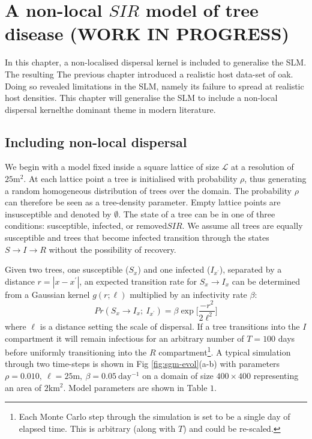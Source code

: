 \chapter{A non-local $SIR$ model of tree disease (WORK IN PROGRESS)}

In this chapter, a non-localised dispersal kernel is included to generalise the SLM.
The resulting 
The previous chapter introduced a realistic host data-set of oak. Doing so revealed limitations in the SLM, namely its failure to spread at realistic host densities.
This chapter will generalise the SLM to include a non-local dispersal kernel\textemdash the dominant theme in modern literature.

\newpage

\section{Including non-local dispersal} %
\label{section:sgm-expo}


We begin with a model fixed inside a square lattice of size $\mathcal{L}$ at a resolution of $\mathrm{25m^2}$. At each lattice point a tree is initialised with probability $\rho$, thus generating a random homogeneous distribution of trees over the domain. The probability $\rho$ can therefore be seen as a tree-density parameter. Empty lattice points are insusceptible and denoted by $\emptyset$. The state of a tree can be in one of three conditions: susceptible, infected, or removed\textemdash $SIR$. We assume all trees are equally susceptible and trees that become infected transition through the states $S\rightarrow I\rightarrow R$ without the possibility of recovery.

Given two trees, one susceptible ($S_x$) and one infected ($I_{x^\prime}$), separated by a distance $r=|x - x^\prime|$, an expected transition rate for $S_x \rightarrow I_x$ can be determined from a Gaussian kernel $g(r; \ell)$ multiplied by an infectivity rate $\beta$:
\begin{equation}
    Pr(S_{x} \rightarrow I_{x} ;\ I_{x^{\prime}} ) = \beta \exp\Big[\frac{-r^2}{2\ell^2}\Big]
\end{equation}
where $\ell$ is a distance setting the scale of dispersal. If a tree transitions into the $I$ compartment it will remain infectious for an arbitrary number of $T=100$ days before uniformly transitioning into the $R$ compartment\footnote{Each Monte Carlo step through the simulation is set to be a single day of elapsed time. This is arbitrary (along with $T$) and could be re-scaled.}. A typical simulation through two time-steps is shown in Fig \ref{fig:sgm-evol}(a-b) with parameters $\rho=0.010,\ \ell = 25\mathrm{m},\ \beta=0.05\ \mathrm{day^{-1}}$ on a domain of size $400\times400$ representing an area of $\mathrm{2km^2}$. Model parameters are shown in Table $1$.

